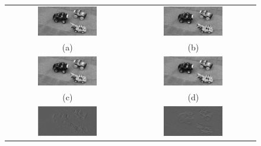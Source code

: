 \documentclass[11pt]{article}
\begin{document}
\begin{figure}[!hbt]
\centering
\begin{tabular}{cc}
  \includegraphics[width=0.5\textwidth]{../toy-car-images-bw/toy_formatted4.png} &
  \includegraphics[width=0.5\textwidth]{../toy-car-images-bw/toy_formatted5.png} \\
  (a) & (b) \\
  \includegraphics[width=0.5\textwidth]{../im4_smooth.png} &
    \includegraphics[width=0.5\textwidth]{../im5_smooth.png} \\
  (c) & (d) \\
  \includegraphics[width=0.5\textwidth]{../Ex4-5.png} &
  \includegraphics[width=0.5\textwidth]{../Ey4-5.png} \\

\end{tabular}
\end{figure}
\end{document}
